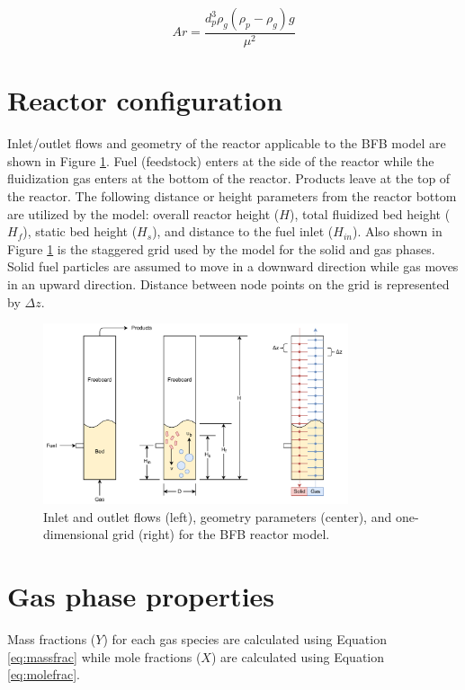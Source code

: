 \documentclass[12pt,titlepage]{article}
\begin{document}
\begin{equation}\label{eq:archimedes}
    Ar = \frac{d_p^3 \rho_g (\rho_p - \rho_g) g}{\mu^2}
\end{equation}

\section{Reactor configuration}

Inlet/outlet flows and geometry of the reactor applicable to the BFB model are shown in Figure \ref{fig:grid}. Fuel (feedstock) enters at the side of the reactor while the fluidization gas enters at the bottom of the reactor. Products leave at the top of the reactor. The following distance or height parameters from the reactor bottom are utilized by the model: overall reactor height ($H$), total fluidized bed height ($H_f$), static bed height ($H_{s}$), and distance to the fuel inlet ($H_{in}$). Also shown in Figure \ref{fig:grid} is the staggered grid used by the model for the solid and gas phases. Solid fuel particles are assumed to move in a downward direction while gas moves in an upward direction. Distance between node points on the grid is represented by $\Delta z$.

\begin{figure}[ht]
    \centering
    \includegraphics[width=0.8\textwidth]{figures/grid.pdf}
    \caption{Inlet and outlet flows (left), geometry parameters (center), and one-dimensional grid (right) for the BFB reactor model.}
    \label{fig:grid}
\end{figure}

\section{Gas phase properties}

Mass fractions ($Y$) for each gas species are calculated using Equation \ref{eq:massfrac} while mole fractions ($X$) are calculated using Equation \ref{eq:molefrac}.
\end{document}

